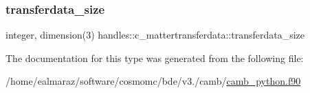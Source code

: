 \subsubsection{\texorpdfstring{transferdata\+\_\+size}{transferdata\_size}}
{\footnotesize\ttfamily integer, dimension(3) handles\+::c\+\_\+mattertransferdata\+::transferdata\+\_\+size}



The documentation for this type was generated from the following file\+:\begin{DoxyCompactItemize}
\item 
/home/ealmaraz/software/cosmomc/bde/v3./camb/\mbox{\hyperlink{camb__python_8f90}{camb\+\_\+python.\+f90}}\end{DoxyCompactItemize}
